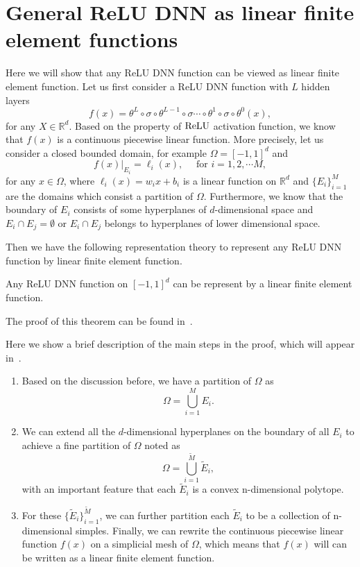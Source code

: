 \section{General ReLU DNN as linear finite element functions}

Here we will show that any ReLU DNN function can be viewed as linear finite element function. 
Let us first consider a ReLU DNN function with $L$ hidden layers
\begin{equation}\label{key}
f(x) = \theta^{L}\circ \sigma \circ \theta^{L-1} \circ \sigma \cdots \circ \theta^1 \circ \sigma \circ \theta^0(x),
\end{equation}
for any $X \in \mathbb{R}^d$.
Based on the property of ${\rm ReLU}$ activation function, we know that $f(x)$ is a continuous 
piecewise linear function. More precisely, let us consider a closed bounded domain, for example $\Omega = [-1, 1]^d$ and 
\begin{equation}\label{key}
\left. f(x) \right|_{E_i} = \ell_i(x),  \quad \text{ for } i =1,2,\cdots M,
\end{equation}
for any $x\in \Omega$, where $\ell_i(x) = w_i x + b_i$ is a linear function on $\mathbb{R}^d$ and 
$\{E_i\}_{i=1}^M$ are the domains which consist a partition of $\Omega$. 
Furthermore, we know that the boundary of $E_i$ consists of some hyperplanes 
of $d$-dimensional space and $E_i \cap E_j = \emptyset$ or $E_i \cap E_j $ belongs to
hyperplanes of lower dimensional space.

Then we have the following representation theory to represent any ReLU DNN function
by linear finite element function.
\begin{theorem}
Any ReLU DNN function on $[-1,1]^d$ can be represent
by a linear finite element function.
\end{theorem}
The proof of this theorem can be found in~\cite{he2020approximation}.


Here we show a brief description of the main steps in the proof, which will appear in~\cite{he2020approximation}.
\begin{enumerate}
	\item Based on the discussion before, we have a partition of $\Omega$ as
	\begin{equation}\label{key}
	\Omega = \bigcup_{i=1}^M E_i.
	\end{equation}
	\item We can extend all the $d$-dimensional hyperplanes on the boundary of all $E_i$ to achieve
	a fine partition of $\Omega$ noted as
	\begin{equation}\label{key}
	\Omega = \bigcup_{i=1}^{\tilde M} \tilde E_i,
	\end{equation}
	with an important feature that each $\tilde E_i$ is a convex n-dimensional polytope.
	\item For these $\{\tilde E_i\}_{i=1}^{\tilde M}$, we can further partition each $\tilde E_i$
	to be a collection of n-dimensional simples. Finally, we can rewrite the continuous
	piecewise linear function $f(x)$ on a simplicial mesh of $\Omega$, which means that $f(x)$
	will can be written as a linear finite element function.
\end{enumerate}




